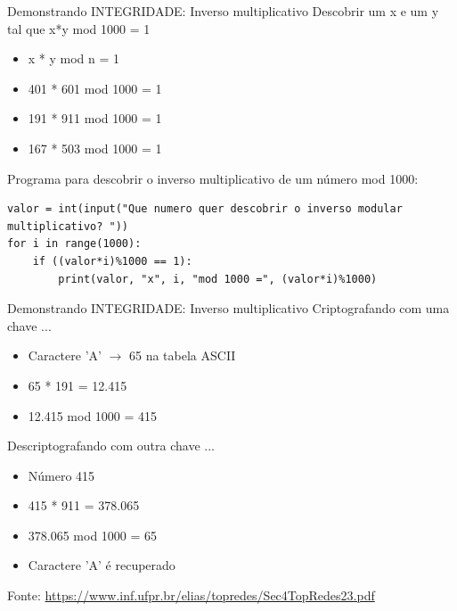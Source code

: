 \documentclass[xcolor=dvipsnames,table]{beamer}
\begin{document}
\begin{frame}[fragile]{Demonstrando INTEGRIDADE: Inverso multiplicativo}
	Descobrir um x e um y tal que x*y mod 1000 = 1
	\begin{itemize}
		\item x * y mod n = 1
		\item 401 * 601 mod 1000 = 1
		\item 191 * 911 mod 1000 = 1
		\item 167 * 503 mod 1000 = 1
	\end{itemize} \pause
	Programa para descobrir o inverso multiplicativo de um número mod 1000:
	\begin{verbatim}
valor = int(input("Que numero quer descobrir o inverso modular
multiplicativo? "))
for i in range(1000):
    if ((valor*i)%1000 == 1):
        print(valor, "x", i, "mod 1000 =", (valor*i)%1000)
	\end{verbatim}
\end{frame}

\begin{frame}{Demonstrando INTEGRIDADE: Inverso multiplicativo}
	Criptografando com uma chave ...
	\begin{itemize}
		\item Caractere 'A' $\rightarrow$ 65 na tabela ASCII
		\item 65 * 191 = 12.415
		\item 12.415 mod 1000 = 415
	\end{itemize} \pause
	Descriptografando com outra chave ...
	\begin{itemize}
		\item Número 415
		\item 415 * 911 = 378.065
		\item 378.065 mod 1000 = 65
		\item Caractere 'A' é recuperado
	\end{itemize}
	Fonte: \url{https://www.inf.ufpr.br/elias/topredes/Sec4TopRedes23.pdf}
\end{frame}
\end{document}
